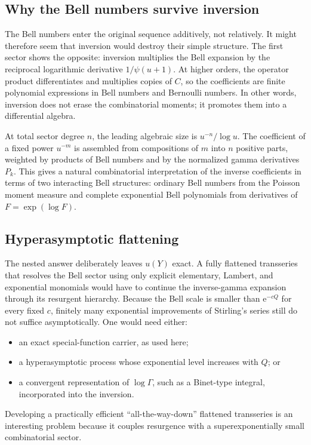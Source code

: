 \documentclass[11pt]{article}
\numberwithin{equation}{section}
\theoremstyle{mainthm}
\theoremstyle{defstyle}
\theoremstyle{remark}
\newcommand{\e}{\mathrm e}
\begin{document}
\subsection{Why the Bell numbers survive inversion}

The Bell numbers enter the original sequence additively, not relatively.  It might therefore seem that inversion would destroy their simple structure.  The first sector shows the opposite: inversion multiplies the Bell expansion by the reciprocal logarithmic derivative \(1/\psi(u+1)\).  At higher orders, the operator product differentiates and multiplies copies of \(C\), so the coefficients are finite polynomial expressions in Bell numbers and Bernoulli numbers.  In other words, inversion does not erase the combinatorial moments; it promotes them into a differential algebra.

At total sector degree \(n\), the leading algebraic size is \(u^{-n}/\log u\).  The coefficient of a fixed power \(u^{-m}\) is assembled from compositions of \(m\) into \(n\) positive parts, weighted by products of Bell numbers and by the normalized gamma derivatives \(P_k\).  This gives a natural combinatorial interpretation of the inverse coefficients in terms of two interacting Bell structures: ordinary Bell numbers from the Poisson moment measure and complete exponential Bell polynomials from derivatives of \(F=\exp(\log F)\).

\subsection{Hyperasymptotic flattening}

The nested answer deliberately leaves \(u(Y)\) exact.  A fully flattened transseries that resolves the Bell sector using only explicit elementary, Lambert, and exponential monomials would have to continue the inverse-gamma expansion through its resurgent hierarchy.  Because the Bell scale is smaller than \(\e^{-cQ}\) for every fixed \(c\), finitely many exponential improvements of Stirling's series still do not suffice asymptotically.  One would need either:
\begin{itemize}
\item an exact special-function carrier, as used here;
\item a hyperasymptotic process whose exponential level increases with \(Q\); or
\item a convergent representation of \(\log\Gamma\), such as a Binet-type integral, incorporated into the inversion.
\end{itemize}
Developing a practically efficient ``all-the-way-down'' flattened transseries is an interesting problem because it couples resurgence with a superexponentially small combinatorial sector.
\end{document}
